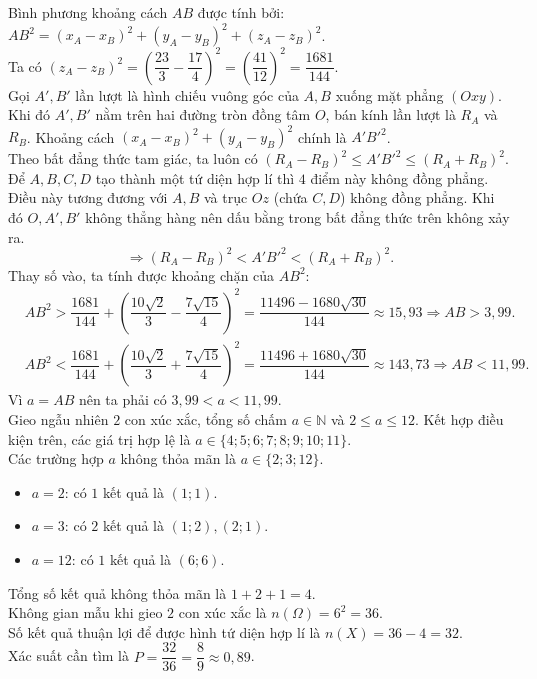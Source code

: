 \begin{ex}
{		Bình phương khoảng cách $AB$ được tính bởi:
		$AB^2 = (x_A - x_B)^2 + (y_A - y_B)^2 + (z_A - z_B)^2$.\\
		Ta có $(z_A - z_B)^2 = \left(\dfrac{23}{3} - \dfrac{17}{4}\right)^2 = \left(\dfrac{41}{12}\right)^2 = \dfrac{1681}{144}$.\\
		Gọi $A', B'$ lần lượt là hình chiếu vuông góc của $A, B$ xuống mặt phẳng $(Oxy)$. Khi đó $A', B'$ nằm trên hai đường tròn đồng tâm $O$, bán kính lần lượt là $R_A$ và $R_B$. Khoảng cách $(x_A - x_B)^2 + (y_A - y_B)^2$ chính là $A'B'^2$.\\
		Theo bất đẳng thức tam giác, ta luôn có $(R_A - R_B)^2 \le A'B'^2 \le (R_A + R_B)^2$.\\
		Để $A, B, C, D$ tạo thành một tứ diện hợp lí thì $4$ điểm này không đồng phẳng. Điều này tương đương với $A, B$ và trục $Oz$ (chứa $C, D$) không đồng phẳng. Khi đó $O, A', B'$ không thẳng hàng nên dấu bằng trong bất đẳng thức trên không xảy ra.
		\[\Rightarrow (R_A - R_B)^2 < A'B'^2 < (R_A + R_B)^2.\]
		Thay số vào, ta tính được khoảng chặn của $AB^2$:
		\allowdisplaybreaks
		\begin{align*}
			&AB^2 > \dfrac{1681}{144} + \left(\dfrac{10\sqrt{2}}{3} - \dfrac{7\sqrt{15}}{4}\right)^2 = \dfrac{11496 - 1680\sqrt{30}}{144} \approx 15{,}93 \Rightarrow AB > 3{,}99.\\
			&AB^2 < \dfrac{1681}{144} + \left(\dfrac{10\sqrt{2}}{3} + \dfrac{7\sqrt{15}}{4}\right)^2 = \dfrac{11496 + 1680\sqrt{30}}{144} \approx 143{,}73 \Rightarrow AB < 11{,}99.
		\end{align*}
		Vì $a = AB$ nên ta phải có $3{,}99 < a < 11{,}99$.\\
		Gieo ngẫu nhiên $2$ con xúc xắc, tổng số chấm $a \in \mathbb{N}$ và $2 \le a \le 12$. Kết hợp điều kiện trên, các giá trị hợp lệ là $a \in \{4; 5; 6; 7; 8; 9; 10; 11\}$.\\
		Các trường hợp $a$ không thỏa mãn là $a \in \{2; 3; 12\}$.
		\begin{itemize}
			\item $a = 2$: có $1$ kết quả là $(1; 1)$.
			\item $a = 3$: có $2$ kết quả là $(1; 2), (2; 1)$.
			\item $a = 12$: có $1$ kết quả là $(6; 6)$.
		\end{itemize}
		Tổng số kết quả không thỏa mãn là $1 + 2 + 1 = 4$.\\
		Không gian mẫu khi gieo $2$ con xúc xắc là $n(\Omega) = 6^2 = 36$.\\
		Số kết quả thuận lợi để được hình tứ diện hợp lí là $n(X) = 36 - 4 = 32$.\\
		Xác suất cần tìm là $P = \dfrac{32}{36} = \dfrac{8}{9} \approx 0{,}89$.
	}
\end{ex}

